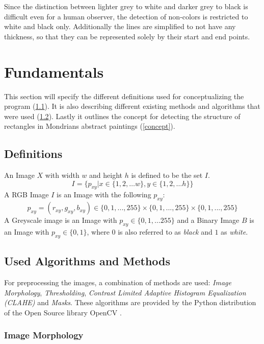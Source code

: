 \documentclass[serif,article,noparskip]{agse-thesis}
\begin{document}
Since the distinction between lighter grey to white and darker grey to black is
difficult even for a human observer, the detection of non-colors is restricted
to white and black only. Additionally the lines are simplified to not have any
thickness, so that they can be represented solely by their start and end points.

\section{Fundamentals} \label{fundamentals}

This section will specify the different definitions used for conceptualizing the
program (\ref{definitions}). It is also describing different existing methods
and algorithms that were used (\ref{used}). Lastly it outlines the concept for
detecting the structure of rectangles in Mondrians abstract paintings
(\ref{concept}).

\subsection{Definitions} \label{definitions}

An Image $X$ with width $w$ and height $h$ is defined to be the set $I$. $$I =
\{p_{xy} | x \in \{1,2, \dots w\}, y \in \{1,2, \dots h\} \}$$ A RGB Image $I$
is an Image with the following  $p_{xy}$: $$p_{xy} = (r_{xy}, g_{xy}, b_{xy})
\in \{0,1,...,255\} \times \{0,1,...,255\} \times\{0,1,...,255\}$$ A Greyscale
image is an Image with $p_{xy} \in \{0,1, \dots 255\}$ and a Binary Image $B$ is
an Image with $p_{xy} \in \{0,1\}$, where $0$ is also referred to as
\textit{black} and $1$ as \textit{white}.

\subsection{Used Algorithms and Methods} \label{used}

For preprocessing the images, a combination of methods are used: \textit{Image
Morphology}, \textit{Thresholding}, \textit{Contrast Limited Adaptive Histogram
Equalization (CLAHE)} and \textit{Masks}. These algorithms are provided by the
Python distribution of the Open Source library OpenCV \cite{opencv_library}.

\subsubsection{Image Morphology}
\end{document}
